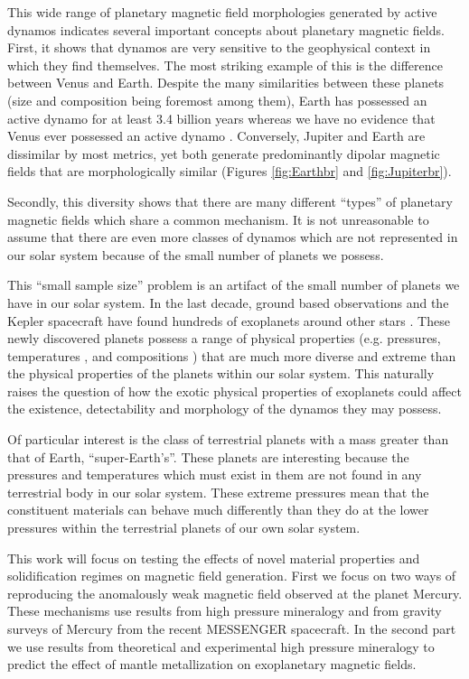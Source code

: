 This wide range of planetary magnetic field morphologies generated by active dynamos indicates several important concepts about planetary magnetic fields. First, it shows that dynamos are very sensitive to the geophysical context in which they find themselves. The most striking example of this is the difference between Venus and Earth. Despite the many similarities between these planets (size and composition being foremost among them), Earth has possessed an active dynamo for at least 3.4 billion years \citep{tarduno2010} whereas we have no evidence that Venus ever possessed an active dynamo \citep{russell1980}. Conversely, Jupiter and Earth are dissimilar by most metrics, yet both generate predominantly dipolar magnetic fields that are morphologically similar (Figures \ref{fig:Earthbr} and \ref{fig:Jupiterbr}). 

Secondly, this diversity shows that there are many different ``types'' of planetary magnetic fields which share a common mechanism. It is not unreasonable to assume that there are even more classes of dynamos which are not represented in our solar system because of the small number of planets we possess.

This ``small sample size'' problem is an artifact of the small number of planets we have in our solar system. In the last decade, ground based observations and the Kepler spacecraft have found hundreds of exoplanets around other stars \citep{rein2015}. These newly discovered planets possess a range of physical properties (e.g. pressures, temperatures \citep{seager2007, valencia2006}, and  compositions \citep{elkins2008, elkins2008coreless}) that are much more diverse and extreme than the physical properties of the planets within our solar system. This naturally raises the question of how the exotic physical properties of exoplanets could affect the existence, detectability and morphology of the dynamos they may possess. 

Of particular interest is the class of terrestrial planets with a mass greater than that of Earth, ``super-Earth's''. These planets are interesting because the pressures and temperatures which must exist in them are not found in any terrestrial body in our solar system. These extreme pressures mean that the constituent materials can behave much differently than they do at the lower pressures within the terrestrial planets of our own solar system. 

This work will focus on testing the effects of novel material properties and solidification regimes on magnetic field generation. First we focus on two ways of reproducing the anomalously weak magnetic field observed at the planet Mercury. These mechanisms use results from high pressure mineralogy and from gravity surveys of Mercury from the recent MESSENGER spacecraft. In the second part we use results from theoretical and experimental high pressure mineralogy to predict the effect of mantle metallization on exoplanetary magnetic fields. 